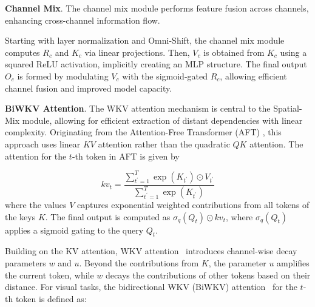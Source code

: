 \noindent\textbf{Channel Mix}. The channel mix module performs feature fusion across channels, enhancing cross-channel information flow.


Starting with layer normalization and Omni-Shift, the channel mix module computes \( R_c \) and \( K_c \) via linear projections. Then, \( V_c \) is obtained from \( K_c \) using a squared ReLU activation, implicitly creating an MLP structure. The final output \( O_c \) is formed by modulating \( V_c \) with the sigmoid-gated \( R_c \), allowing efficient channel fusion and improved model capacity.


\noindent\textbf{BiWKV Attention}. The WKV attention mechanism is central to the Spatial-Mix module, allowing for efficient extraction of distant dependencies with linear complexity. Originating from the Attention-Free Transformer (AFT) \cite{Zhai.2021.AFT}, this approach uses linear $KV$ attention rather than the quadratic $QK$ attention. The attention for the \( t \)-th token in AFT is given by

\begin{equation}
kv_t = \frac{\sum_{t^{\prime}=1}^T \exp(K_{t^{\prime}}) \odot V_{t^{\prime}}}{\sum_{t^{\prime}=1}^T \exp(K_{t^{\prime}})}
\end{equation}
where the values $V$ captures exponential weighted contributions from all tokens of the keys $K$. The final output is computed as \( \sigma_q(Q_t) \odot kv_t \), where \( \sigma_q(Q_t) \) applies a sigmoid gating to the query \( Q_t \).

Building on the KV attention, WKV attention~\cite{Peng.2023.RWKV} introduces channel-wise decay parameters \( w \) and \( u \). Beyond the contributions from \( K \), the parameter \( u \) amplifies the current token, while \( w \) decays the contributions of other tokens based on their distance. For visual tasks, the bidirectional WKV (BiWKV) attention~\cite{Duan.2024.Vision-RWKV} for the \( t \)-th token is defined as:

